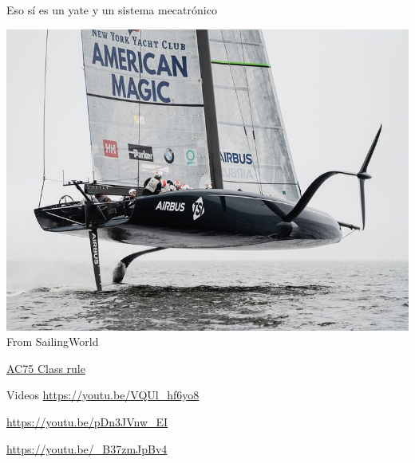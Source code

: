\documentclass[presentation,aspectratio=169]{beamer}
\begin{document}
\begin{frame}[label={sec:org04de5c1}]{Eso \alert{sí} es un yate \alert{y} un sistema mecatrónico}
\begin{center}
\includegraphics[height=0.7\textheight]{../../figures/ac75.jpeg}\\
{\footnotesize  From SailingWorld}
\end{center}

\href{https://www.sailingscuttlebutt.com/wp-content/uploads/2018/03/AC75\_Class\_Rule.pdf}{AC75 Class rule}
\end{frame}
\begin{frame}[label={sec:org73fb350}]{Videos}
\url{https://youtu.be/VQUl\_hf6yo8}

\url{https://youtu.be/pDn3JVnw\_EI}

\url{https://youtu.be/\_B37zmJpBv4}
\end{frame}
\end{document}
